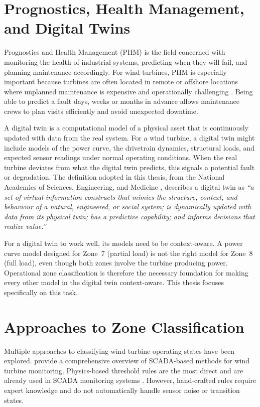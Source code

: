 \section{Prognostics, Health Management, and Digital Twins}
\label{sec:intro:phm}

Prognostics and Health Management (PHM) is the field concerned with monitoring the
health of industrial systems, predicting when they will fail, and planning maintenance
accordingly. For wind turbines, PHM is especially important because turbines are often
located in remote or offshore locations where unplanned maintenance is expensive and
operationally challenging \citep{tavner2012}. Being able to predict a fault days,
weeks or months in advance allows maintenance crews to plan visits efficiently and avoid
unexpected downtime.

A digital twin is a computational model of a physical asset that is continuously updated
with data from the real system. For a wind turbine, a digital twin might include models
of the power curve, the drivetrain dynamics, structural loads, and expected sensor
readings under normal operating conditions. When the real turbine deviates from what the
digital twin predicts, this signals a potential fault or degradation. The definition
adopted in this thesis, from the National Academies of Sciences, Engineering, and
Medicine \citeyearpar{nationalacademies2024}, describes a digital twin as \textit{``a
set of virtual information constructs that mimics the structure, context, and behaviour
of a natural, engineered, or social system; is dynamically updated with data from its
physical twin; has a predictive capability; and informs decisions that realize
value.''}

For a digital twin to work well, its models need to be context-aware. A power curve
model designed for Zone~7 (partial load) is not the right model for Zone~8 (full load),
even though both zones involve the turbine producing power. Operational zone
classification is therefore the necessary foundation for making every other model in the
digital twin context-aware. This thesis focuses specifically on this task.

\section{Approaches to Zone Classification}
\label{sec:intro:approaches}

Multiple approaches to classifying wind turbine operating states have been explored.
\citet{pandit2024} provide a comprehensive overview of SCADA-based methods for wind
turbine monitoring.
Physics-based threshold rules are the most direct and are already used in SCADA
monitoring systems \citep{pandit2024}. However, hand-crafted rules require expert knowledge
and do not automatically handle sensor noise or transition states.

